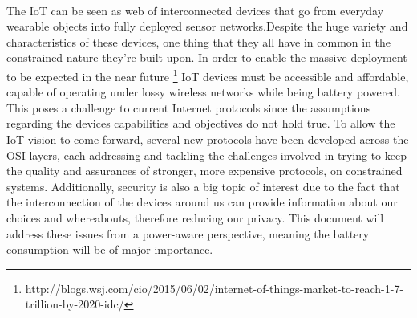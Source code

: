 \paragraph{}The \ac{IoT} can be seen as web of interconnected devices that go from everyday wearable objects into fully deployed sensor networks.Despite the huge variety and characteristics of these devices, one thing that they all have in common in the constrained nature they're built upon. In order to enable the massive deployment to be expected in the near future \footnote{http://blogs.wsj.com/cio/2015/06/02/internet-of-things-market-to-reach-1-7-trillion-by-2020-idc/} \ac{IoT} devices must be accessible and affordable, capable of operating under lossy wireless networks while being battery powered. This poses a challenge to current Internet protocols since the assumptions regarding the devices capabilities and objectives do not hold true. To allow the \ac{IoT} vision to come forward, several new protocols have been developed across the OSI layers, each addressing and tackling the challenges involved in trying to keep the quality and assurances of stronger, more expensive protocols, on constrained systems.
Additionally, security is also a big topic of interest due to the fact that the interconnection of the devices around us can provide information about our choices and whereabouts, therefore reducing our privacy.
This document will address these issues from a power-aware perspective, meaning the battery consumption will be of major importance.
